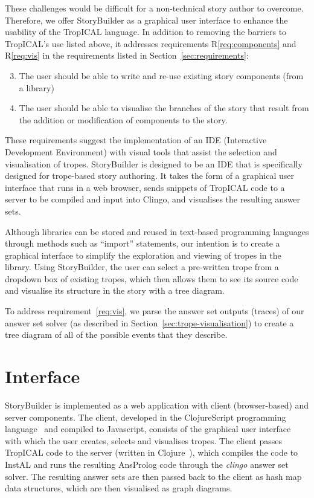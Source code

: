 \documentclass[11pt]{report}
\begin{document}
These challenges would be difficult for a non-technical story author to
overcome. Therefore, we offer StoryBuilder as a graphical user interface to enhance the usability of
the TropICAL language. In addition to removing the barriers to TropICAL's use
listed above, it addresses requirements
R\ref{req:components} and R\ref{req:vis} in the requirements listed in Section~\ref{sec:requirements}:

\begin{enumerate}[R1.]
  \setcounter{enumi}{2}
  \item The user should be able to write and re-use
    existing story components (from a library)
  \setcounter{enumi}{6}
  \item The user should be able to visualise the branches of the
    story that result from the addition or modification of components to the story.
\end{enumerate}

These requirements suggest the implementation of an IDE (Interactive Development
Environment) with visual tools that assist the selection and visualisation of
tropes. StoryBuilder is designed to be an IDE that is specifically designed for
trope-based story authoring. It takes the form of a graphical user interface
that runs in a web browser, sends snippets of TropICAL code to a server to be
compiled and input into Clingo, and visualises the resulting answer sets.

Although libraries can be stored and reused in text-based programming languages
through methods such as ``import'' statements, our intention is to create a
graphical interface to simplify the exploration and viewing of tropes in the
library. Using StoryBuilder, the user can select a pre-written trope from a
dropdown box of existing tropes, which then allows them to see its source code
and visualise its structure in the story with a tree diagram.

To address requirement~\ref{req:vis}, we parse the answer set outputs (traces)
of our answer set solver (as described in Section~\ref{sec:trope-visualisation}) to create a tree
diagram of all of the possible events that they describe.

\section{Interface}

StoryBuilder is implemented as a web application with client (browser-based)
and server components. The client, developed in the ClojureScript programming
language~\citep{clojurescript} and compiled to Javascript, consists of the graphical user interface
with which the user creates, selects and visualises tropes. The client passes
TropICAL code to the server (written in Clojure~\citep{clojure}), which compiles
the code to InstAL and runs the resulting AnsProlog code through the
\emph{clingo} answer set solver. The resulting answer sets are then passed back
to the client as hash map data structures, which are then visualised as graph diagrams.
\end{document}
